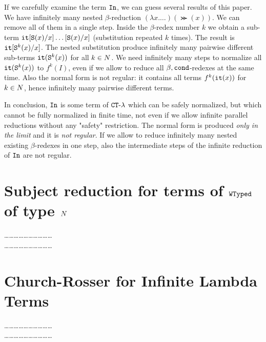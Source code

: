 \documentclass{article}
\begin{document}
If we carefully examine the term ${\tt In}$, we can guess several results of this paper.
We have infinitely many nested $\beta$-reduction $(\lambda x. \ldots)(\Succ (x))$.
We can remove all of them in a single step. Inside the $\beta$-redex number $k$ we obtain a sub-term
${\tt it}[{\tt S} (x)/x]\ldots[{\tt S} (x)/x]$ (substitution repeated $k$ times).
The result is ${\tt it}[{\tt S} ^k(x)/x] $.
The nested substitution produce infinitely many pairwise different sub-terms 
${\tt it}({\tt S} ^k(x))$ for all $k \in {N}$.
We need infinitely many steps to normalize all ${\tt it}({\tt S} ^k(x))$ to $f^k(I)$, 
even if we allow to reduce all $\beta,{\tt cond}$-redexes at the same time.
Also the normal form is not regular: it contains all terms $f^k({\tt it}(x))$ for $k \in {N}$, hence
infinitely many pairwise different terms. 

In conclusion, 
${\tt In}$ is some term of ${ {\tt CT} \mbox{-} \lambda}$ which can be safely normalized, but which 
cannot be fully normalized in finite time, not even if we allow
infinite parallel reductions without any "safety" restriction. 
The normal form is produced \emph{only in the limit}
and it is \emph{not regular}. If we allow to reduce infinitely many nested existing
$\beta$-redexes in one step, also
the intermediate steps of the infinite reduction of ${\tt In}$ are not regular.



\section{Subject reduction for terms of ${\tt WTyped}$ of type ${N}$}
\label{section-subject-reduction}
\ldots\ldots\ldots\ldots\ldots\ldots\ldots\ldots\ldots\ldots
\\
\ldots\ldots\ldots\ldots\ldots\ldots\ldots\ldots\ldots\ldots


\section{Church-Rosser for Infinite Lambda Terms}
\label{section-church-rosser}
\ldots\ldots\ldots\ldots\ldots\ldots\ldots\ldots\ldots\ldots
\\
\ldots\ldots\ldots\ldots\ldots\ldots\ldots\ldots\ldots\ldots
\end{document}
